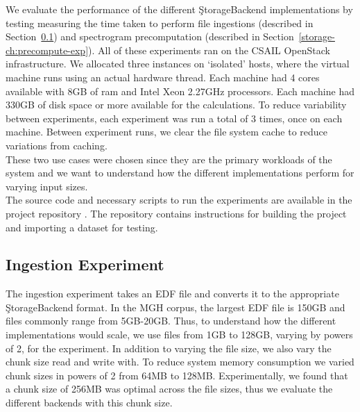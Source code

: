 We evaluate the performance of the different \c{StorageBackend} implementations
by testing measuring the time taken to perform file ingestions (described in
Section~\ref{storage-ch:ingestion-exp}) and spectrogram precomputation
(described in Section~\ref{storage-ch:precompute-exp}). All of these
experiments ran on the CSAIL OpenStack infrastructure. We allocated three
instances on `isolated' hosts, where the virtual machine runs using an actual
hardware thread. Each machine had 4 cores available with 8GB of ram and Intel
Xeon 2.27GHz processors. Each machine had 330GB of disk space or more available
for the calculations. To reduce variability between experiments, each
experiment was run a total of 3 times, once on each machine. Between experiment
runs, we clear the file system cache to reduce variations from caching. \\

These two use cases were chosen since they are the primary workloads of the
system and we want to understand how the different implementations perform for
varying input sizes.\\

The source code and necessary scripts to run the experiments are available
in the project repository \cite{eeg-toolkit}. The repository contains
instructions for building the project and importing a dataset for testing.

\subsection{Ingestion Experiment}\label{storage-ch:ingestion-exp}

The ingestion experiment takes an EDF file and converts it to the appropriate
\c{StorageBackend} format. In the MGH corpus, the largest EDF file is 150GB and
files commonly range from 5GB-20GB. Thus, to understand how the different
implementations would scale, we use files from 1GB to 128GB, varying by powers
of 2, for the experiment. In addition to varying the file size, we also vary
the chunk size read and write with. To reduce system memory consumption we
varied chunk sizes in powers of 2 from 64MB to 128MB. Experimentally, we found
that a chunk size of 256MB was optimal across the file sizes, thus we evaluate
the different backends with this chunk size.

